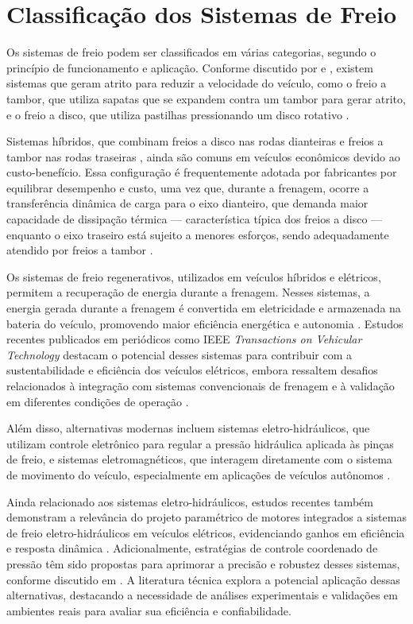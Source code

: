 \section{Classificação dos Sistemas de Freio}
\label{sec:o-estado-da-arte-1-3}
Os sistemas de freio podem ser classificados em várias categorias, segundo o princípio de funcionamento e aplicação. Conforme discutido por  e , existem sistemas que geram atrito para reduzir a velocidade do veículo, como o freio a tambor, que utiliza sapatas que se expandem contra um tambor para gerar atrito, e o freio a disco, que utiliza pastilhas pressionando um disco rotativo \cite{Lentin2022}.

Sistemas híbridos, que combinam freios a disco nas rodas dianteiras e freios a tambor nas rodas traseiras \cite{Lentin2022}, ainda são comuns em veículos econômicos devido ao custo-benefício. Essa configuração é frequentemente adotada por fabricantes por equilibrar desempenho e custo, uma vez que, durante a frenagem, ocorre a transferência dinâmica de carga para o eixo dianteiro, que demanda maior capacidade de dissipação térmica — característica típica dos freios a disco — enquanto o eixo traseiro está sujeito a menores esforços, sendo adequadamente atendido por freios a tambor \cite{Rudolf2011}.

Os sistemas de freio regenerativos, utilizados em veículos híbridos e elétricos, permitem a recuperação de energia durante a frenagem. Nesses sistemas, a energia gerada durante a frenagem é convertida em eletricidade e armazenada na bateria do veículo, promovendo maior eficiência energética e autonomia \cite{Donghai2022}. Estudos recentes publicados em periódicos como IEEE \textit{Transactions on Vehicular Technology} destacam o potencial desses sistemas para contribuir com a sustentabilidade e eficiência dos veículos elétricos, embora ressaltem desafios relacionados à integração com sistemas convencionais de frenagem e à validação em diferentes condições de operação \cite{Kumar2024}.

Além disso, alternativas modernas incluem sistemas eletro-hidráulicos, que utilizam controle eletrônico para regular a pressão hidráulica aplicada às pinças de freio, e sistemas eletromagnéticos, que interagem diretamente com o sistema de movimento do veículo, especialmente em aplicações de veículos autônomos \cite{Donghai2022}.

Ainda relacionado aos sistemas eletro-hidráulicos, estudos recentes também demonstram a relevância do projeto paramétrico de motores integrados a sistemas de freio eletro-hidráulicos em veículos elétricos, evidenciando ganhos em eficiência e resposta dinâmica \cite{MotorParametricDesign2023}. Adicionalmente, estratégias de controle coordenado de pressão têm sido propostas para aprimorar a precisão e robustez desses sistemas, conforme discutido em . A literatura técnica explora a potencial aplicação dessas alternativas, destacando a necessidade de análises experimentais e validações em ambientes reais para avaliar sua eficiência e confiabilidade.

